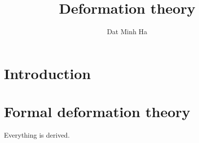 

\setcounter{section}{-1}





    \title{Deformation theory}
    
    \author{Dat Minh Ha}
    \maketitle
    
    \begin{abstract}
        
    \end{abstract}
    
    {
      \hypersetup{} 
      \tableofcontents %
    }

    \section{Introduction}
    
    \section{Formal deformation theory}
        \begin{convention}
            Everything is derived.
        \end{convention}
    
